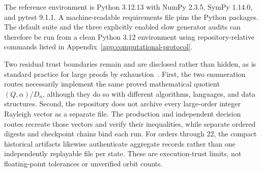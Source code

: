 The reference environment is Python 3.12.13 with NumPy 2.3.5, SymPy 1.14.0,
and pytest 9.1.1. A machine-readable requirements file pins the Python
packages. The default suite and the three explicitly enabled slow generator
audits can therefore be run from a clean Python 3.12 environment using
repository-relative commands listed in Appendix~\ref{app:computational-protocol}.

Two residual trust boundaries remain and are disclosed rather than hidden, as
is standard practice for large proofs by exhaustion~\cite{Lam1991}. First, the
two enumeration routes necessarily implement the same proved mathematical
quotient \((Q,\alpha)/D_n\), although they do so with different algorithms,
languages, and data structures. Second, the repository does not archive every
large-order integer Rayleigh vector as a separate file. The production and
independent decision routes recreate those vectors and verify their
inequalities, while separate ordered digests and checkpoint chains bind each
run. For orders through 22, the compact historical artifacts likewise
authenticate aggregate records rather than one independently replayable file
per state. These are execution-trust limits, not floating-point tolerances or
unverified orbit counts.
